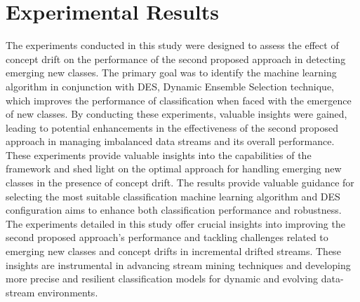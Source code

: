\section{Experimental Results}
\label{sec:results}
The experiments conducted in this study were designed to assess the effect of concept drift on the performance of the second proposed approach in detecting emerging new classes. The primary goal was to identify the machine learning algorithm in conjunction with DES, Dynamic Ensemble Selection technique, which improves the performance of classification when faced with the emergence of new classes. By conducting these experiments, valuable insights were gained, leading to potential enhancements in the effectiveness of the second proposed approach in managing imbalanced data streams and its overall performance. These experiments provide valuable insights into the capabilities of the framework and shed light on the optimal approach for handling emerging new classes in the presence of concept drift. The results provide valuable guidance for selecting the most suitable classification machine learning algorithm and DES configuration aims to enhance both classification performance and robustness. The experiments detailed in this study offer crucial insights into improving the second proposed approach's performance and tackling challenges related to emerging new classes and concept drifts in incremental drifted streams. These insights are instrumental in advancing stream mining techniques and developing more precise and resilient classification models for dynamic and evolving data-stream environments.
